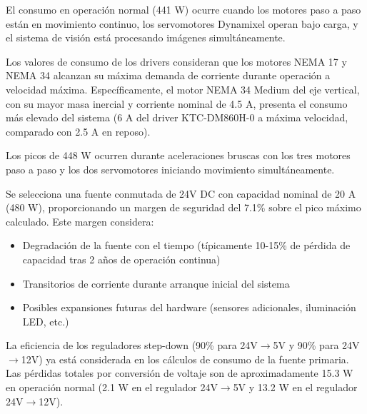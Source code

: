 El consumo en operación normal (441 W) ocurre cuando los motores paso a paso están en movimiento continuo, los servomotores Dynamixel operan bajo carga, y el sistema de visión está procesando imágenes simultáneamente.

Los valores de consumo de los drivers consideran que los motores NEMA 17 y NEMA 34 alcanzan su máxima demanda de corriente durante operación a velocidad máxima. Específicamente, el motor NEMA 34 Medium del eje vertical, con su mayor masa inercial y corriente nominal de 4.5 A, presenta el consumo más elevado del sistema (6 A del driver KTC-DM860H-0 a máxima velocidad, comparado con 2.5 A en reposo).

Los picos de 448 W ocurren durante aceleraciones bruscas con los tres motores paso a paso y los dos servomotores iniciando movimiento simultáneamente.

Se selecciona una fuente conmutada de 24V DC con capacidad nominal de 20 A (480 W), proporcionando un margen de seguridad del 7.1\% sobre el pico máximo calculado. Este margen considera:

\begin{itemize}[label=$\bullet$]
\item Degradación de la fuente con el tiempo (típicamente 10-15\% de pérdida de capacidad tras 2 años de operación continua)
\item Transitorios de corriente durante arranque inicial del sistema
\item Posibles expansiones futuras del hardware (sensores adicionales, iluminación LED, etc.)
\end{itemize}

La eficiencia de los reguladores step-down (90\% para 24V$\rightarrow$5V y 90\% para 24V$\rightarrow$12V) ya está considerada en los cálculos de consumo de la fuente primaria. Las pérdidas totales por conversión de voltaje son de aproximadamente 15.3 W en operación normal (2.1 W en el regulador 24V$\rightarrow$5V y 13.2 W en el regulador 24V$\rightarrow$12V).
